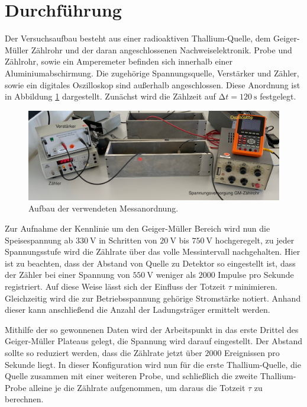 \section{Durchführung}
\label{sec:durchführung}

Der Versuchsaufbau besteht aus einer radioaktiven Thallium-Quelle, dem Geiger-Müller Zählrohr und der daran angeschlossenen
Nachweiselektronik. Probe und Zählrohr, sowie ein Amperemeter befinden sich innerhalb einer Aluminiumabschirmung. Die zugehörige Spannungsquelle,
Verstärker und Zähler, sowie ein digitales Oszilloskop sind außerhalb angeschlossen. Diese Anordnung ist in Abbildung \ref{fig:aufbau} dargestellt.
Zunächst wird die Zählzeit auf $\increment t = \qty{120}{\second}$ festgelegt.

\begin{figure}[H]
	\centering
	\includegraphics[width=0.9\linewidth]{content/grafik/aufbau.jpg}
	\caption{Aufbau der verwendeten Messanordnung.}
	\label{fig:aufbau}
\end{figure}

Zur Aufnahme der Kennlinie um den Geiger-Müller Bereich wird nun die Speisespannung ab $\qty{330}{\volt}$ in Schritten von $\qty{20}{\volt}$
bis $\qty{750}{\volt}$ hochgeregelt, zu jeder Spannungsstufe wird die Zählrate über das volle Messintervall nachgehalten. Hier ist zu beachten,
dass der Abstand von Quelle zu Detektor so eingestellt ist, dass der Zähler bei einer Spannung von $\qty{550}{\volt}$ weniger als $\num{2000}$
Impulse pro Sekunde registriert. Auf diese Weise lässt sich der Einfluss der Totzeit $\tau$ minimieren. Gleichzeitig wird die zur
Betriebsspannung gehörige Stromstärke notiert. Anhand dieser kann anschließend die Anzahl der Ladungsträger ermittelt werden.

Mithilfe der so gewonnenen Daten wird der Arbeitspunkt in das erste Drittel des Geiger-Müller Plateaus gelegt, die Spannung wird darauf
eingestellt. Der Abstand sollte so reduziert werden, dass die Zählrate jetzt über $\num{2000}$ Ereignissen pro Sekunde liegt. In dieser
Konfiguration wird nun für die erste Thallium-Quelle, die Quelle zusammen mit einer weiteren Probe, und schließlich die zweite Thallium-Probe
alleine je die Zählrate aufgenommen, um daraus die Totzeit $\tau$ zu berechnen.

